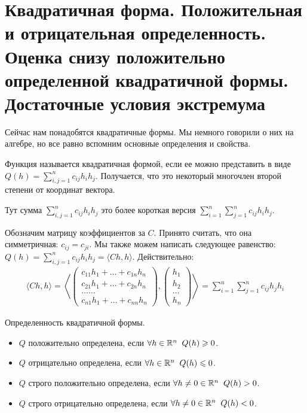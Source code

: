 \section{Квадратичная форма. Положительная и отрицательная определенность. Оценка снизу положительно определенной квадратичной формы. Достаточные условия экстремума}
Сейчас нам понадобятся квадратичные формы.
Мы немного говорили о них на алгебре, но все равно вспомним основные определения и свойства.
\begin{conj}
    Функция называется квадратичная формой, если ее можно представить в виде $Q(h) = \sum\limits_{i, j = 1}^n c_{ij}h_ih_j$.
    Получается, что это некоторый многочлен второй степени от координат вектора.
\end{conj}
Тут сумма $\sum\limits_{i, j = 1}^n c_{ij}h_ih_j$ это более короткая версия $\sum\limits_{i=1}^n\sum\limits_{j=1}^n c_{ij}h_ih_j$.

Обозначим матрицу коэффициентов за $C$.
Принято считать, что она симметричная: $c_{ij} = c_{ji}$.
Мы также можем написать следующее равенство: $Q(h) = \sum\limits_{i, j = 1}^n c_{ij}h_ih_j = \langle Ch, h \rangle$.
Действительно: \begin{gather*}
    \langle Ch, h \rangle = \left \langle \begin{pmatrix}
        c_{11}h_1 + \dots + c_{1n}h_n \\
        c_{21}h_1 + \dots + c_{2n}h_n \\
        \dots \dots \\
        c_{n1}h_1 + \dots + c_{nn}h_n
    \end{pmatrix}, \begin{pmatrix}
        h_1 \\
        h_2 \\
        \dots \\
        h_n
    \end{pmatrix} \right \rangle = 
    \sum_{i=1}^n \sum_{j=1}^n c_{ij}h_jh_i
\end{gather*}

\begin{conj} Определенность квадратичной формы.

    \begin{itemize}
        \item $Q$ положительно определена, если $\forall h \in \mathbb{R}^n \;\; Q(h) \geqslant 0$.
        \item $Q$ отрицательно определена, если $\forall h \in \mathbb{R}^n \;\; Q(h) \leqslant 0$.
        \item $Q$ строго положительно определена, если $\forall h \neq 0 \in \mathbb{R}^n \;\; Q(h) > 0$.
        \item $Q$ строго отрицательно определена, если $\forall h \neq 0 \in \mathbb{R}^n \;\; Q(h) < 0$. 
    \end{itemize}
\end{conj}

